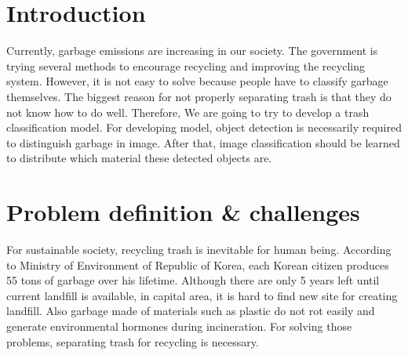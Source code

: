 \documentclass{article}
\begin{document}
\section{Introduction}
{Currently, garbage emissions are increasing in our society. The government is trying several methods to encourage recycling and improving the recycling system. However, it is not easy to solve because people have to classify garbage themselves. The biggest reason for not properly separating trash is that they do not know how to do well. Therefore, We are going to try to develop a trash classification model. For developing model, object detection is necessarily required to distinguish garbage in image. After that, image classification should be learned to distribute which material these detected objects are.} \\

\section{Problem definition \& challenges}
{For sustainable society, recycling trash is inevitable for human being. According to Ministry of Environment of Republic of Korea, each Korean citizen produces 55 tons of garbage over his lifetime. Although there are only 5 years left until current landfill is available, in capital area, it is hard to find new site for creating landfill. Also garbage made of materials such as plastic do not rot easily and generate environmental hormones during incineration. For solving those problems, separating trash for recycling is necessary.
}\\
\end{document}
